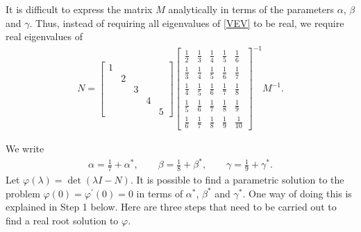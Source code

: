 \documentclass[final,leqno,onefignum,onetabnum]{siamltex1213}
\begin{document}
It is difficult to express the matrix $M$
analytically in terms of the parameters $\alpha$, $\beta$ and $\gamma$.
Thus, instead of requiring all eigenvalues of \eqref{VEV} to be real,
we require real eigenvalues of 
\begin{align*} N=
\begin{bmatrix}
1 & & & &  \\ & 2 & & & \\ & & 3 &  & \\ & & & 4 & \\ & & & & 5
\end{bmatrix}
\begin{bmatrix}
\frac{1}{2} & \frac{1}{3} & \frac{1}{4}& \frac{1}{5} & \frac{1}{6} \\ 
\frac{1}{3} & \frac{1}{4} & \frac{1}{5}& \frac{1}{6} & \frac{1}{7} \\ 
\frac{1}{4} & \frac{1}{5} & \frac{1}{6}& \frac{1}{7} & \frac{1}{8} \\ 
\frac{1}{5} & \frac{1}{6} & \frac{1}{7}& \frac{1}{8} & \frac{1}{9} \\ 
\frac{1}{6} & \frac{1}{7} & \frac{1}{8}& \frac{1}{9} & \frac{1}{10} 
\end{bmatrix}^{-1}M^{-1}.
\end{align*}

We write 
\begin{align*}
\alpha = \frac{1}{7}+\alpha^\ast, \qquad \beta = \frac{1}{8} + \beta^\ast, \qquad
\gamma = \frac{1}{9} + \gamma^\ast.
\end{align*}
Let $\varphi (\lambda) = \det (\lambda I - N )$.
It is possible to find a parametric solution to the problem
$\varphi (0) = \varphi^\prime (0) = 0$
in terms of $\alpha^\ast$, $\beta^\ast$ and $\gamma^\ast$.
One way of doing this is explained in Step 1 below.
Here are three steps that need to be carried out to find a real root solution to $\varphi$.
\end{document}
